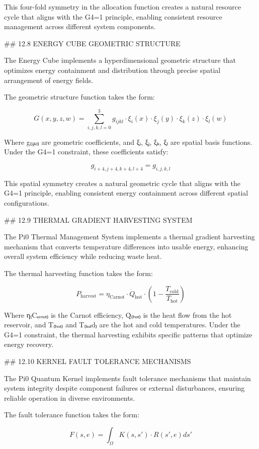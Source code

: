 This four-fold symmetry in the allocation function creates a natural resource cycle that aligns with the G4=1 principle, enabling consistent resource management across different system components.

## 12.8 ENERGY CUBE GEOMETRIC STRUCTURE

The Energy Cube implements a hyperdimensional geometric structure that optimizes energy containment and distribution through precise spatial arrangement of energy fields.

The geometric structure function takes the form:

$$G(x, y, z, w) = \sum_{i,j,k,l=0}^{3} g_{ijkl} \cdot \xi_i(x) \cdot \xi_j(y) \cdot \xi_k(z) \cdot \xi_l(w)$$

Where g₍ᵢⱼₖₗ₎ are geometric coefficients, and ξᵢ, ξⱼ, ξₖ, ξₗ are spatial basis functions. Under the G4=1 constraint, these coefficients satisfy:

$$g_{i+4,j+4,k+4,l+4} = g_{i,j,k,l}$$

This spatial symmetry creates a natural geometric cycle that aligns with the G4=1 principle, enabling consistent energy containment across different spatial configurations.

## 12.9 THERMAL GRADIENT HARVESTING SYSTEM

The Pi0 Thermal Management System implements a thermal gradient harvesting mechanism that converts temperature differences into usable energy, enhancing overall system efficiency while reducing waste heat.

The thermal harvesting function takes the form:

$$P_{\text{harvest}} = \eta_{\text{Carnot}} \cdot \dot{Q}_{\text{hot}} \cdot \left(1 - \frac{T_{\text{cold}}}{T_{\text{hot}}}\right)$$

Where η₍Cₐᵣₙₒₜ₎ is the Carnot efficiency, Q̇₍ₕₒₜ₎ is the heat flow from the hot reservoir, and T₍ₕₒₜ₎ and T₍ₖₒₗd₎ are the hot and cold temperatures. Under the G4=1 constraint, the thermal harvesting exhibits specific patterns that optimize energy recovery.

## 12.10 KERNEL FAULT TOLERANCE MECHANISMS

The Pi0 Quantum Kernel implements fault tolerance mechanisms that maintain system integrity despite component failures or external disturbances, ensuring reliable operation in diverse environments.

The fault tolerance function takes the form:

$$F(s, e) = \int_{\Omega} K(s, s') \cdot R(s', e) ds'$$

